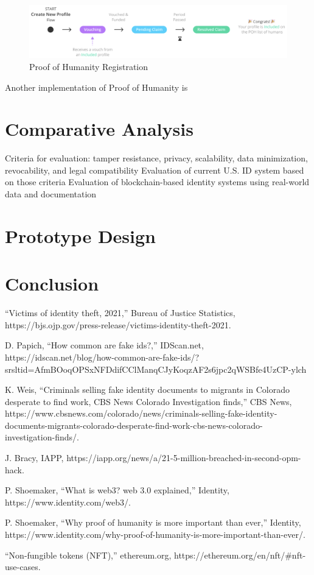\documentclass[conference]{IEEEtran}
\begin{document}
\begin{figure}[h!]
    \centering
    \includegraphics[width=0.9\linewidth]{poh-kleros.png}
    \caption{Proof of Humanity Registration}
    \label{fig:poh-kleros}
\end{figure}

Another implementation of Proof of Humanity is 


\section{Comparative Analysis}
Criteria for evaluation: tamper resistance, privacy, scalability, data minimization, revocability, and legal compatibility
Evaluation of current U.S. ID system based on those criteria
Evaluation of blockchain-based identity systems using real-world data and documentation

\section{Prototype Design}

\section{Conclusion}


\begin{thebibliography}{00}
“Victims of identity theft, 2021,” Bureau of Justice Statistics, https://bjs.ojp.gov/press-release/victims-identity-theft-2021. 

D. Papich, “How common are fake ids?,” IDScan.net,
https://idscan.net/blog/how-common-are-fake-ids/?srsltid=AfmBOoqOPSxNFDdifCClManqCJyKoqzAF2s6jpc2qWSBfe4UzCP-ylch

K. Weis, “Criminals selling fake identity documents to migrants in Colorado desperate to find work, CBS News Colorado Investigation finds,” CBS News, https://www.cbsnews.com/colorado/news/criminals-selling-fake-identity-documents-migrants-colorado-desperate-find-work-cbs-news-colorado-investigation-finds/. 

J. Bracy, IAPP, https://iapp.org/news/a/21-5-million-breached-in-second-opm-hack. 

P. Shoemaker, “What is web3? web 3.0 explained,” Identity, https://www.identity.com/web3/.

P. Shoemaker, “Why proof of humanity is more important than ever,” Identity, https://www.identity.com/why-proof-of-humanity-is-more-important-than-ever/.

“Non-fungible tokens (NFT),” ethereum.org, https://ethereum.org/en/nft/#nft-use-cases.

\end{thebibliography}
\end{document}
